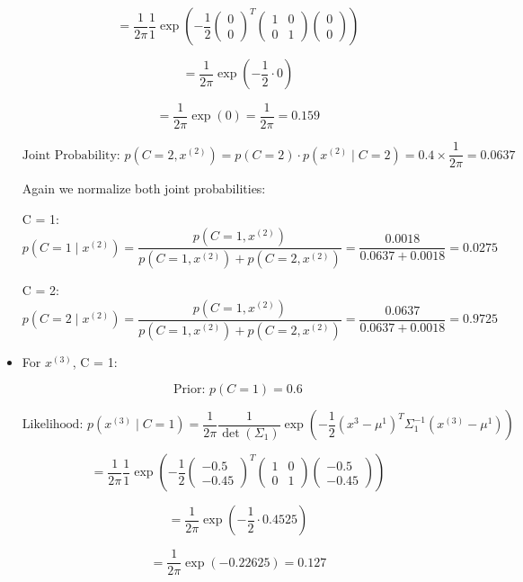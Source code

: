\documentclass{article}
\begin{document}
\begin{itemize}
\[
= \frac{1}{2\pi} \frac{1}{1} \exp \left( -\frac{1}{2} \begin{pmatrix} 0 \\ 0 \end{pmatrix}^T \begin{pmatrix} 1 & 0 \\ 0 & 1 \end{pmatrix} \begin{pmatrix} 0 \\ 0 \end{pmatrix} \right)
\]

\[
= \frac{1}{2\pi} \exp \left( -\frac{1}{2} \cdot 0 \right) 
\]

\[
= \frac{1}{2\pi} \exp(0) = \frac{1}{2\pi} = 0.159
\]

\[
\text{Joint Probability: } p(C = 2, x^{(2)}) = p(C = 2) \cdot p(x^{(2)} \mid C = 2) = 0.4 \times \frac{1}{2\pi} = 0.0637
\]

Again we normalize both joint probabilities:

C = 1:
\[
p(C = 1 \mid x^{(2)}) = \frac{p(C = 1, x^{(2)})}{p(C = 1, x^{(2)}) + p(C = 2, x^{(2)})} = \frac{0.0018}{0.0637 + 0.0018} = 0.0275
\]

C = 2:
\[
p(C = 2 \mid x^{(2)}) = \frac{p(C = 1, x^{(2)})}{p(C = 1, x^{(2)}) + p(C = 2, x^{(2)})} = \frac{0.0637}{0.0637 + 0.0018} = 0.9725
\]


 \item[\textbullet] For \( x^{(3)} \), C = 1: 


\[
\text{Prior: } p(C = 1) = 0.6
\] 

\[
\text{Likelihood: } p \left( x^{(3)} \mid C = 1 \right) = \frac{1}{2\pi} \frac{1}{\det(\Sigma_1)} \exp \left( -\frac{1}{2} \left( x^{3} - \mu^1 \right)^T \Sigma_1^{-1} \left( x^{(3)} - \mu^1 \right) \right)
\]

\[
= \frac{1}{2\pi} \frac{1}{1} \exp \left( -\frac{1}{2} \begin{pmatrix} -0.5 \\ -0.45 \end{pmatrix}^T \begin{pmatrix} 1 & 0 \\ 0 & 1 \end{pmatrix} \begin{pmatrix} -0.5 \\ -0.45 \end{pmatrix} \right)
\]

\[
= \frac{1}{2\pi} \exp \left( -\frac{1}{2} \cdot 0.4525 \right) 
\]

\[
= \frac{1}{2\pi} \exp(-0.22625) = 0.127
\]


\end{itemize}
\end{document}
